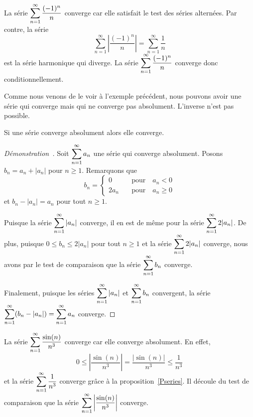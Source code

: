 {\begin{egg}
La série $\displaystyle \sum_{n=1}^\infty \frac{(-1)^n}{n}$ converge
car elle satisfait le test des séries alternées.  Par contre, la série
\[
\sum_{n=1}^\infty \left|\frac{(-1)^n}{n}\right| =
\sum_{n=1}^\infty \frac{1}{n}
\]
est la série harmonique qui diverge.  La série
$\displaystyle \sum_{n=1}^\infty \frac{(-1)^n}{n}$ converge donc
conditionnellement.
\end{egg}

Comme nous venons de le voir à l'exemple précédent, nous pouvons avoir une
série qui converge mais qui ne converge pas absolument.  L'inverse
n'est pas possible.

\begin{theorem}
Si une série converge absolument alors elle converge.
\end{theorem}

\begin{proof}[Démonstration\ \theory]
Soit $\displaystyle \sum_{n=1}^\infty a_n$ une série qui converge
absolument.  Posons $b_n = a_n + |a_n|$ pour $n\geq 1$.
Remarquons que
\[
b_n = \begin{cases}
0 & \quad \text{pour}\quad  a_n<0 \\
2 a_n & \quad \text{pour}\quad  a_n \geq 0
\end{cases}
\]
et $b_n - |a_n| = a_n$ pour tout $n\geq 1$.

Puisque la série $\displaystyle \sum_{n=1}^\infty |a_n|$ converge, il
en est de même pour la
série $\displaystyle \sum_{n=1}^\infty 2 |a_n|$.  De 
plus, puisque $0 \leq b_n \leq 2 |a_n|$ pour tout $n\geq 1$ et la
série $\displaystyle \sum_{n=1}^\infty 2 |a_n|$ converge, nous avons par le
test de comparaison que la série $\displaystyle \sum_{n=1}^\infty b_n$
converge.

Finalement, puisque les séries $\displaystyle \sum_{n=1}^\infty |a_n|$
et $\displaystyle \sum_{n=1}^\infty b_n$ convergent, la série
$\displaystyle \sum_{n=1}^\infty (b_n - |a_n|) = \sum_{n=1}^\infty a_n$
converge.
\end{proof}

\begin{egg}
La série $\displaystyle \sum_{n=1}^\infty \frac{\sin(n)}{n^3}$
converge car elle converge absolument.  En effet,
\[
0 \leq \left| \frac{\sin(n)}{n^3} \right|
= \frac{|\sin(n)|}{n^3} \leq \frac{1}{n^3}
\]
et la série $\displaystyle \sum_{n=1}^\infty \frac{1}{n^3}$ converge
grâce à la proposition~\ref{Pseries}.  Il découle du test de comparaison
que la série
$\displaystyle \sum_{n=1}^\infty \left| \frac{\sin(n)}{n^3} \right|$
converge.
\end{egg}

}
